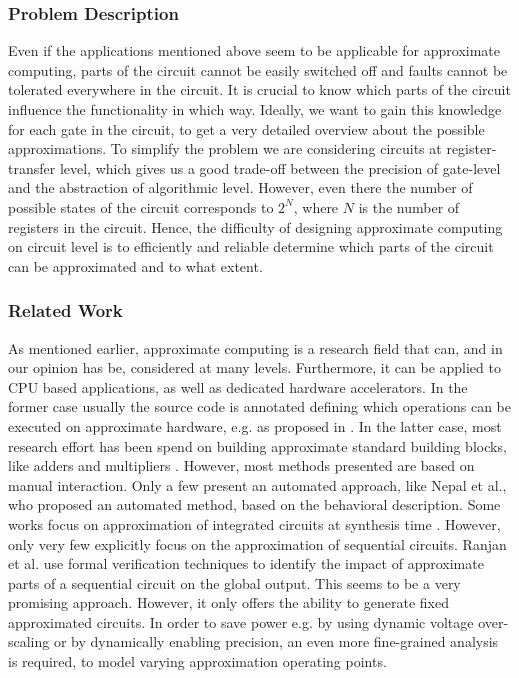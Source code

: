 \documentclass[conference]{IEEEtran}
\begin{document}
\subsubsection*{Problem Description}
Even if the applications mentioned above seem to be applicable for approximate computing, parts of the circuit cannot be easily switched off and faults cannot be tolerated everywhere in the circuit. It is crucial to know which parts of the circuit influence the functionality in which way. Ideally, we want to gain this knowledge for each gate in the circuit, to get a very detailed overview about the possible approximations. To simplify the problem we are considering circuits at register-transfer level, which gives us a good trade-off between the precision of gate-level and the abstraction of algorithmic level. However, even there the number of possible states of the circuit corresponds to $2^N$, where $N$ is the number of registers in the circuit. Hence, the difficulty of designing approximate computing on circuit level is to efficiently and reliable determine which parts of the circuit can be approximated and to what extent.
\subsubsection*{Related Work}
As mentioned earlier, approximate computing is a research field that can, and in our opinion has be, considered at many levels. Furthermore, it can be applied to CPU based applications, as well as dedicated hardware accelerators. In the former case usually the source code is annotated defining which operations can be executed on approximate hardware, e.g. as proposed in \cite{sampson_enerj:_2011}. In the latter case, most research effort has been spend on building approximate standard building blocks, like adders and multipliers \cite{huang_exploring_2011,chakrapani_highly_2008,gupta_impact:_2011,kahng_accuracy-configurable_2012}. However, most methods presented are based on manual interaction. Only a few present an automated approach, like Nepal et al., who proposed an automated method, based on the behavioral description. Some works focus on approximation of integrated circuits at synthesis time \cite{miao_approximate_2013,shin_approximate_2010,choudhury_approximate_2008}. However, only very few explicitly focus on the approximation of sequential circuits. Ranjan et al. \cite{ranjan_aslan:_2014} use formal verification techniques to identify the impact of approximate parts of a sequential circuit on the global output. This seems to be a very promising approach. However, it only offers the ability to generate fixed approximated circuits. In order to save power e.g. by using dynamic voltage over-scaling or by dynamically enabling precision, an even more fine-grained analysis is required, to model varying approximation operating points.
\end{document}
